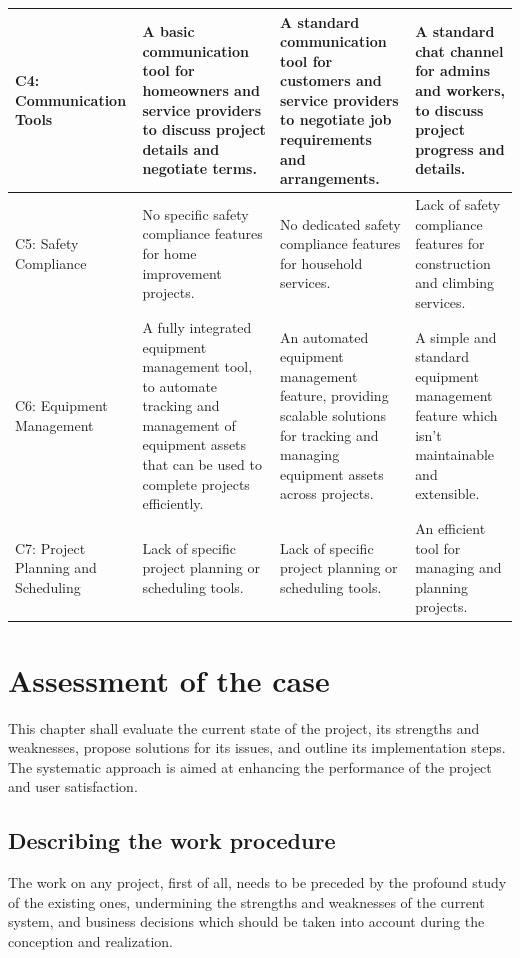 \begin{longtable}{|p{2cm}|p{3.5cm}|p{3.5cm}|p{3.5cm}|}
    C4: Communication Tools & A basic communication tool for homeowners and service providers to discuss project details and negotiate terms. & A standard communication tool for customers and service providers to negotiate job requirements and arrangements. & A standard chat channel for admins and workers, to discuss project progress and details. \\
    \hline
    C5: Safety Compliance & No specific safety compliance features for home improvement projects. & No dedicated safety compliance features for household services. & Lack of safety compliance features for construction and climbing services. \\
    \hline
    C6: Equipment Management & A fully integrated equipment management tool, to automate tracking and  management of equipment assets that can be used to complete projects efficiently. & An automated equipment management feature, providing scalable solutions for tracking and managing equipment assets across projects. & A simple and standard equipment management feature which isn’t maintainable and extensible.\\
    \hline
    C7: Project Planning and Scheduling & Lack of specific project planning or scheduling tools. & Lack of specific project planning or scheduling tools. & An efficient tool for managing and planning projects. \\
    \hline
\end{longtable}

\section{Assessment of the case}
This chapter shall evaluate the current state of the project, its strengths and weaknesses, propose solutions for its issues, and outline its implementation steps. The systematic approach is aimed at enhancing the performance of the project and user satisfaction.

\subsection{Describing the work procedure}
The work on any project, first of all, needs to be preceded by the profound study of the existing ones, undermining the strengths and weaknesses of the current system, and business decisions which should be taken into account during the conception and realization.

